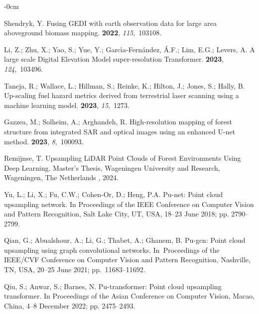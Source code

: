 \documentclass[remotesensing,article,accept,pdftex,moreauthors]{Definitions/mdpi}
\renewcommand{\hl}[1]{#1}
\begin{document}
\begin{adjustwidth}{-\extralength}{0cm}
\begin{thebibliography}{999}
Shendryk, Y.
\newblock Fusing GEDI with earth observation data for large area aboveground
  biomass mapping.
 {\bf 2022}, {\em 115},~103108.

Li, Z.; Zhu, X.; Yao, S.; Yue, Y.; Garc{\'\i}a-Fern{\'a}ndez, {\'A}.F.; Lim,
  E.G.; Levers, A.
\newblock A large scale Digital Elevation Model super-resolution Transformer.
 {\bf 2023}, {\em 124},~103496.

Taneja, R.; Wallace, L.; Hillman, S.; Reinke, K.; Hilton, J.; Jones, S.; Hally,
  B.
\newblock Up-scaling fuel hazard metrics derived from terrestrial laser
  scanning using a machine learning model.
 {\bf 2023}, {\em 15},~1273.

Gazzea, M.; Solheim, A.; Arghandeh, R.
\newblock High-resolution mapping of forest structure from integrated SAR and
  optical images using an enhanced U-net method.
 {\bf 2023}, {\em 8},~100093.

Remijnse, T.
\newblock Upsampling LiDAR Point Clouds of Forest Environments Using Deep Learning. \hl{Master's Thesis, Wageningen University and Research, Wageningen, The Netherlands}%
, 2024.

Yu, L.; Li, X.; Fu, C.W.; Cohen-Or, D.; Heng, P.A.
\newblock Pu-net: Point cloud upsampling network.
\newblock In Proceedings of the IEEE Conference on Computer
  Vision and Pattern Recognition, \hl{Salt Lake City, UT, USA, 18--23 June} 2018; pp. 2790--2799.

Qian, G.; Abualshour, A.; Li, G.; Thabet, A.; Ghanem, B.
\newblock Pu-gcn: Point cloud upsampling using graph convolutional networks.
\newblock In~Proceedings of the IEEE/CVF Conference on
  Computer Vision and Pattern Recognition, \hl{Nashville, TN, USA, 20--25 June} 2021; \mbox{pp. 11683--11692}.

Qiu, S.; Anwar, S.; Barnes, N.
\newblock Pu-transformer: Point cloud upsampling transformer.
\newblock In Proceedings of the Asian Conference on Computer
  Vision, \hl{Macao, China, 4--8 December} 2022; pp. 2475--2493.


\end{thebibliography}
\end{adjustwidth}
\end{document}
